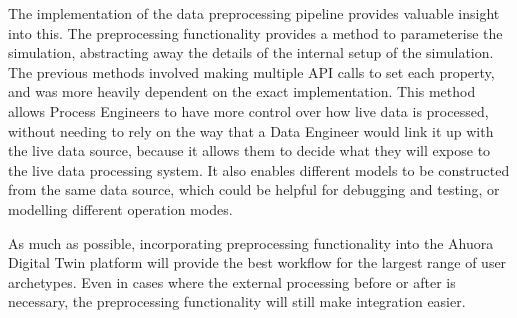 
The implementation of the data preprocessing pipeline provides valuable insight into this.
 The preprocessing functionality provides a method to parameterise the simulation, abstracting away the details of the internal setup of the simulation. The previous methods involved making multiple API calls to set each property, and was more heavily dependent on the exact implementation. This method allows Process Engineers to have more control over how live data is processed, without needing to rely on the way that a Data Engineer would link it up with the live data source, because it allows them to decide what they will expose to the live data processing system. It also enables different models to be constructed from the same data source, which could be helpful for debugging and testing, or modelling different operation modes.

 As much as possible, incorporating preprocessing functionality into the Ahuora Digital Twin platform will provide the best workflow for the largest range of user archetypes. Even in cases where the external processing before or after is necessary, the preprocessing functionality will still make integration easier. 





